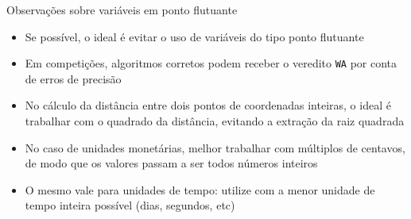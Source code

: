 \begin{frame}[fragile]{Observações sobre variáveis em ponto flutuante}

    \begin{itemize}
        \item Se possível, o ideal é evitar o uso de variáveis do tipo ponto flutuante

        \item Em competições, algoritmos corretos podem receber o veredito \texttt{WA} por
            conta de erros de precisão

        \item No cálculo da distância entre dois pontos de coordenadas inteiras, o ideal é 
        trabalhar com o quadrado da distância, evitando a extração da raiz quadrada

        \item No caso de unidades monetárias, melhor trabalhar com múltiplos de centavos, de modo
            que os valores passam a ser todos números inteiros

        \item O mesmo vale para unidades de tempo: utilize com a menor unidade de tempo inteira
            possível (dias, segundos, etc)
    \end{itemize}

\end{frame}
